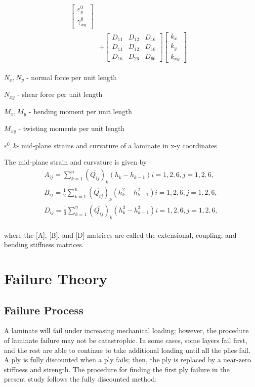 \documentclass[10pt, journal]{IEEEtran}
\begin{document}
\begin{equation}
\begin{array}{l}
\begin{aligned}
\begin{bmatrix}
        \varepsilon_y^0 \\
		\gamma_{xy}^0
    \end{bmatrix} \\ 
	&+  
	\begin{bmatrix}
		D_{11} & D_{12} & D_{16} \\
		D_{11} & D_{12} & D_{16} \\
		D_{16} & D_{26} & D_{66} 
	\end{bmatrix}
	\begin{bmatrix}
		k_x \\
		k_y \\
		k_{xy} 
	\end{bmatrix}
\end{aligned}
	\end{array}
\end{equation}


$N_x,N_y $  - normal force per unit length

$N_{xy} $  - shear force per unit length

$M_x, M_y $ - bending moment per unit length

$M_{xy} $  - twisting moments per unit length

$\varepsilon^{0}, k $- mid-plane strains and curvature of a laminate in x-y coordinates

The mid-plane strain and curvature is given by
\begin{equation}
    \begin{split}
	&A_{ij}=\sum_{k=1}^{n}(\overline{Q_{ij}})_k(h_k-h_{k-1})  i=1,2,6, j=1,2,6 \textstyle{,}\\
	&B_{ij}=\frac{1}{2}\sum_{k=1}^{n}(\overline{Q_{ij}})_k(h^2_k - h_{k-1}^2)  i=1,2,6, j=1,2,6 \textstyle{,}\\
	&D_{ij}=\frac{1}{3}\sum_{k=1}^{n}(\overline{Q_{ij}})_k(h^3_k - h_{k-1}^3) i=1,2,6, j=1,2,6 \textstyle{,}\\
    \end{split}
\end{equation}

where the [A], [B], and [D] matrices are called the extensional, coupling, and bending stiffness matrices.

\section{Failure Theory}

\subsection{Failure Process}
A laminate will fail under increasing mechanical loading; however, the procedure of laminate failure may not
be catastrophic.
 In some cases, some layers fail first, and the rest are able to continue to take additional loading
 until all the plies fail. A ply is fully discounted when a ply fails; then, the ply is replaced
by a near-zero stiffness and strength. 
The procedure for finding the first ply failure in the present
study follows the fully discounted method:
\end{document}
